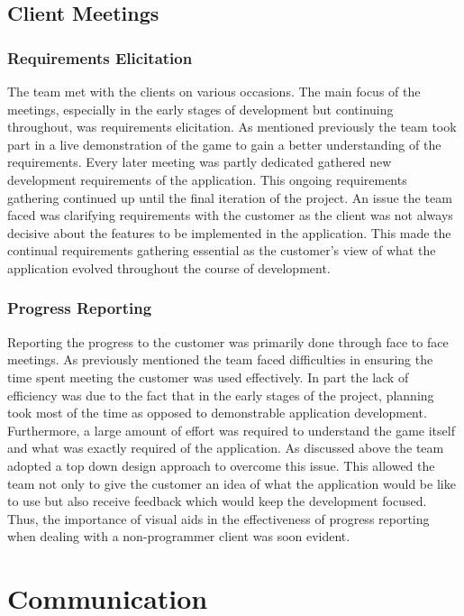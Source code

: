 \documentclass{l3proj}
\begin{document}
\subsection{Client Meetings}

\subsubsection{Requirements Elicitation}
The team met with the clients on various occasions. The main focus of the meetings, especially in the early stages of development but continuing throughout, was requirements elicitation. As mentioned previously the team took part in a live demonstration of the game to gain a better understanding of the requirements. Every later meeting was partly dedicated gathered new development requirements of the application. This ongoing requirements gathering continued up until the final iteration of the project. An issue the team faced was clarifying requirements with the customer as the client was not always decisive about the features to be implemented in the application. This made the continual requirements gathering essential as the customer's view of what the application evolved throughout the course of development.

\subsubsection{Progress Reporting}
Reporting the progress to the customer was primarily done through face to face meetings. As previously mentioned the team faced difficulties in ensuring the time spent meeting the customer was used effectively. In part the lack of efficiency was due to the fact that in the early stages of the project, planning took most of the time as opposed to demonstrable application development. Furthermore, a large amount of effort was required to understand the game itself and what was exactly required of the application. As discussed above the team adopted a top down design approach to overcome this issue. This allowed the team not only to give the customer an idea of what the application would be like to use but also receive feedback which would keep the development focused. Thus, the importance of visual aids in the effectiveness of progress reporting when dealing with a non-programmer client was soon evident.

\section{Communication}
\label{sec:communication}
\end{document}
